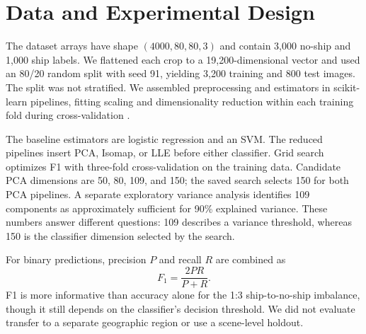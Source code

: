 \documentclass[conference]{IEEEtran}
\begin{document}
\section{Data and Experimental Design}
The dataset arrays have shape $(4000,80,80,3)$ and contain 3,000 no-ship and 1,000 ship labels. We flattened each crop to a 19,200-dimensional vector and used an 80/20 random split with seed 91, yielding 3,200 training and 800 test images. The split was not stratified. We assembled preprocessing and estimators in scikit-learn pipelines, fitting scaling and dimensionality reduction within each training fold during cross-validation \cite{sklearn}.

The baseline estimators are logistic regression and an SVM. The reduced pipelines insert PCA, Isomap, or LLE before either classifier. Grid search optimizes F1 with three-fold cross-validation on the training data. Candidate PCA dimensions are 50, 80, 109, and 150; the saved search selects 150 for both PCA pipelines. A separate exploratory variance analysis identifies 109 components as approximately sufficient for 90\% explained variance. These numbers answer different questions: 109 describes a variance threshold, whereas 150 is the classifier dimension selected by the search.

For binary predictions, precision $P$ and recall $R$ are combined as
\begin{equation}
F_1=\frac{2PR}{P+R}.
\end{equation}
F1 is more informative than accuracy alone for the 1:3 ship-to-no-ship imbalance, though it still depends on the classifier's decision threshold. We did not evaluate transfer to a separate geographic region or use a scene-level holdout.
\end{document}
